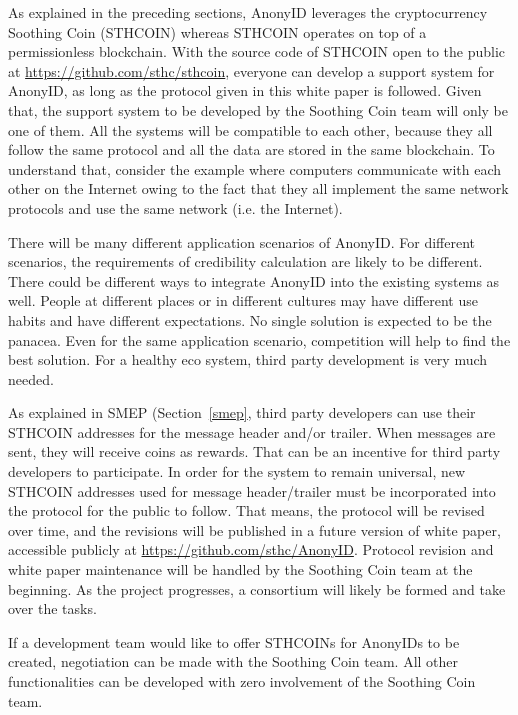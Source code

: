 \documentclass[12pt, a4paper]{article}
\begin{document}
As explained in the preceding sections, AnonyID leverages the cryptocurrency Soothing Coin (STHCOIN) whereas STHCOIN operates on top of a permissionless blockchain. With the source code of STHCOIN open to the public at \href{https://github.com/sthc/sthcoin}{https://github.com/sthc/sthcoin}, everyone can develop a support system for AnonyID, as long as the protocol given in this white paper is followed. Given that, the support system to be developed by the Soothing Coin team will only be one of them. All the systems will be compatible to each other, because they all follow the same protocol and all the data are stored in the same blockchain. To understand that, consider the example where computers communicate with each other on the Internet owing to the fact that they all implement the same network protocols and use the same network (i.e. the Internet).

There will be many different application scenarios of AnonyID. For different scenarios, the requirements of credibility calculation are likely to be different. There could be different ways to integrate AnonyID into the existing systems as well. People at different places or in different cultures may have different use habits and have different expectations.  No single solution is expected to be the panacea. Even for the same application scenario, competition will help to find the best solution. For a healthy eco system, third party development is very much needed.

As explained in SMEP (Section~\ref{smep}, third party developers can use their STHCOIN addresses for the message header and/or trailer. When messages are sent, they will receive coins as rewards. That can be an incentive for third party developers to participate. In order for the system to remain universal, new STHCOIN addresses used for message header/trailer must be incorporated into the protocol for the public to follow. That means, the protocol will be revised over time, and the revisions will be published in a future version of white paper, accessible publicly at \href{https://github.com/sthc/AnonyID}{https://github.com/sthc/AnonyID}. Protocol revision and white paper maintenance will be handled by the Soothing Coin team at the beginning. As the project progresses, a consortium will likely be formed and take over the tasks.

If a development team would like to offer STHCOINs for AnonyIDs to be created, negotiation can be made with the Soothing Coin team. 
All other functionalities can be developed with zero involvement of the Soothing Coin team.
\end{document}
